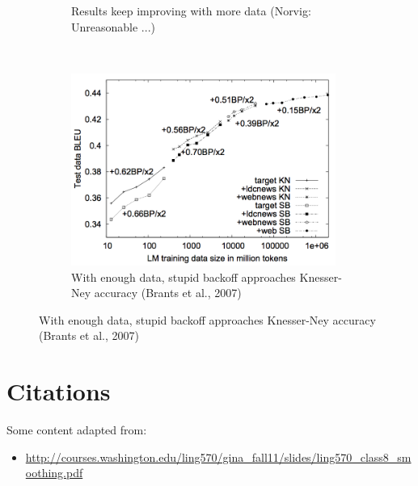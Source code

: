 \documentclass[11pt,letterpaper]{article}
\begin{document}
\begin{itemize}
\begin{figure}[h]
\begin{subfigure}[b]{0.3\textwidth}
                \caption{Results keep improving with more data (Norvig: Unreasonable ...)}
        \end{subfigure}
        ~~~
        \begin{subfigure}[b]{0.3\textwidth}
                \includegraphics[width=0.95\textwidth]{stupid-backoff.png}
                \caption{With enough data, stupid backoff approaches Knesser-Ney accuracy  (Brants et al., 2007)}
        \end{subfigure}
      \end{figure}
      \vspace{-6mm}
\end{itemize}





\section{Citations}

Some content adapted from:

\begin{itemize}
  \item \url{http://courses.washington.edu/ling570/gina_fall11/slides/ling570_class8_smoothing.pdf}
\end{itemize}
\end{document}
